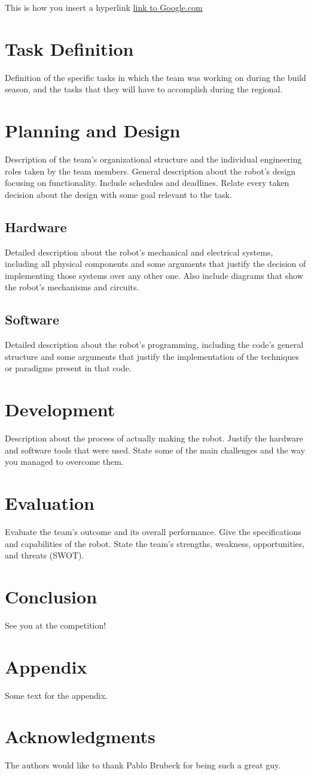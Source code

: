 \documentclass[%
 reprint, %
 amsmath,amssymb,
 aps,
 pra,
]{revtex4-1}
\begin{document}
This is how you insert a hyperlink \href{http://google.com}{link to Google.com}


\section{Task Definition}
Definition of the specific tasks in which the team was working on during the build season, and the tasks that they will have to accomplish during the regional.

\section{Planning and Design}
Description of the team's organizational structure and the individual engineering roles taken by the team members. General description about the robot's design focusing on functionality. Include schedules and deadlines. Relate every taken decision about the design with some goal relevant to the task.

\subsection{Hardware}
Detailed description about the robot's mechanical and electrical systems, including all physical components and some arguments that justify the decision of implementing those systems over any other one. Also include diagrams that show the robot's mechanisms and circuits.

\subsection{Software}
Detailed description about the robot's programming, including the code's general structure and some arguments that justify the implementation of the techniques or paradigms present in that code. 


\section{Development}
Description about the process of actually making the robot. Justify the hardware and software tools that were used. State some of the main challenges and the way you managed to overcome them.


\section{Evaluation}
Evaluate the team's outcome and its overall performance. Give the specifications and capabilities of the robot. State the team's strengths, weakness, opportunities, and threats (SWOT).

\section{Conclusion}
See you at the competition!

\section{Appendix}
Some text for the appendix.

\section*{Acknowledgments}
The authors would like to thank Pablo Brubeck for being such a great guy.



\end{document}
